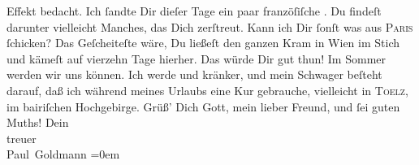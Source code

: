 \begin{ledgroupsized}[t]{13cm}
{{{                  Effekt bedacht}}}\label{K_L02728-3h}.\pend
           \pstart
           Ich ſandte Dir dieſer Tage ein paar franzöſiſche \label{K_L02728-4v}\label{K_L02728-4h}. Du findeſt darunter vielleicht Manches, das Dich zerſtreut.
               Kann ich Dir ſonſt was aus \textsc{Paris} ſchicken? Das Geſcheiteſte wäre, Du ließeſt den ganzen Kram in Wien im Stich und kämeſt auf vierzehn Tage hierher. Das würde
               Dir gut thun!\pend
           \pstart
           {\pb}Im Sommer werden wir uns \label{K_L02728-5v}\label{K_L02728-5h} können. Ich werde \label{K_L02728-6v}\label{K_L02728-6h} und kränker, und mein Schwager beſteht darauf, daß ich während meines Urlaubs eine Kur gebrauche,
               vielleicht in \textsc{Toelz}, im bairiſchen
               Hochgebirge.\pend
           \pstart
           Grüß’ Dich Gott, mein lieber Freund, und ſei guten Muths!\pend
           \pstart
           Dein {\\[\baselineskip]}treuer {\\[\baselineskip]}\spacefill\mbox{Paul Goldmann}\pend
           \leftskip=0em{}
         
         \endnumbering{}\end{ledgroupsized}  \newcommand{\dateiname}{L02728}\newcommand{\titel}{Paul Goldmann an Arthur Schnitzler, 6. 2. [1895]}\newcommand{\editorInnen}{Martin Anton Müller und Laura Untner}
      